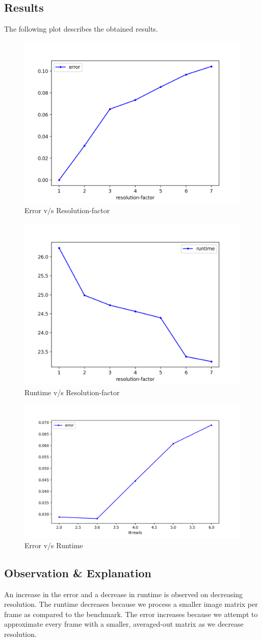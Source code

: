 \documentclass[a4paper]{article}
\begin{document}
\subsection*{Results}
The following plot describes the obtained results.
\begin{figure}[H]
    \centering
    \includegraphics[width=0.5\linewidth]{resolution-error.png}
    \caption{Error v/s Resolution-factor}
    \label{fig:spatial-thread-error.png}
\end{figure}
\begin{figure}[H]
    \centering
    \includegraphics[width=0.5\linewidth]{runtime-resolution.png}
    \caption{Runtime v/s Resolution-factor}
    \label{fig:spatial-thread-error.png}
\end{figure}
\begin{figure}[H]
    \centering
    \includegraphics[width=0.5\linewidth]{spatial-thread-error.png}
    \caption{Error v/s Runtime}
    \label{fig:spatial-thread-error.png}
\end{figure}
\subsection*{Observation \& Explanation}
An increase in the error and a decrease in runtime is observed on decreasing resolution. The runtime decreases because we process a smaller image matrix per frame as compared to the benchmark. The error increases because we attempt to approximate every frame with a smaller, averaged-out matrix as we decrease resolution.
\end{document}
